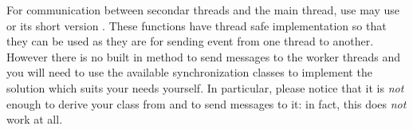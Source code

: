For communication between secondar threads and the main thread, use may use 
or its short version . These functions
have thread safe implementation so that they can be used as they are for
sending event from one thread to another. However there is no built in method
to send messages to the worker threads and you will need to use the available
synchronization classes to implement the solution which suits your needs
yourself. In particular, please notice that it is \emph{not} enough to derive
your class from  and 
 to send messages to it: in fact, this does
\emph{not} work at all.


